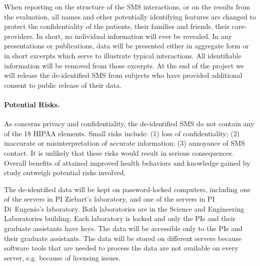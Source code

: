  When reporting on the structure of the SMS interactions, or on the results from the  evaluation,  all names and other potentially identifying features are changed to protect the confidentiality of the patients, their families and friends, their care-providers. In short, no individual information will ever be revealed. In any  presentations or publications, data will be presented either in aggregate form or in short excerpts which serve to illustrate  typical  interactions. All identifiable information will be removed from those  excerpts. At the end of the project we will  release the de-identified SMS from subjects who have provided additional  consent to  public release of their data. 


 \paragraph{Potential Risks.} As concerns privacy and confidentiality, 
 the de-identified SMS do not contain any of the 18 HIPAA elements. Small risks include: (1) loss of confidentiality; (2) inaccurate or misinterpretation of accurate information; (3) annoyance of SMS contact. It is unlikely that these risks would result in serious consequences. Overall benefits of attained improved health behaviors and knowledge gained by study outweigh potential risks involved.  
 
 The de-identified data will be kept on password-locked computers, including one of the servers  in PI Ziebart's   laboratory,  and one of the servers in PI Di~Eugenio's  laboratory. Both laboratories are in the Science and
Engineering Laboratories building. Each laboratory   is locked and only the PIs and their
graduate assistants have keys. The data will be
 accessible only to the PIs and their graduate assistants. 
The data will be stored on different 
servers  because software tools that are needed to process the data are not available on every server, e.g. because of licensing issues.


  

